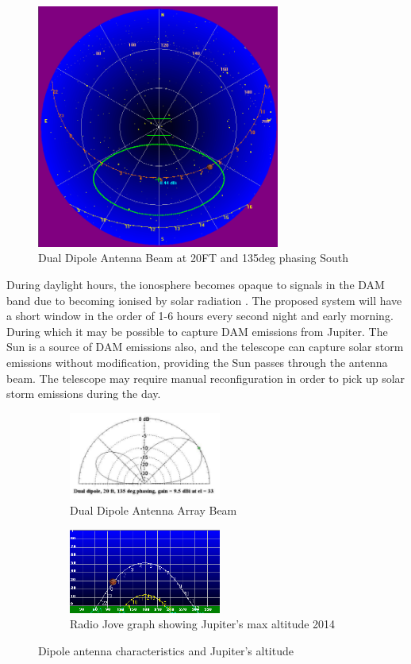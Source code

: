 %
\begin{figure}[here]
\centering
\includegraphics[width=8cm]{images/07}
\caption{Dual Dipole Antenna Beam at 20FT and 135deg phasing South \citep{nasa12}}
\label{fig:dual_dipole_20ft_135phasing_s}
\end{figure}
%

During daylight hours, the ionosphere becomes opaque to signals in the \gls{DAM} band due to becoming ionised by solar radiation \citep{nasa-ionosphere-12}. The proposed system will have a short window in the order of 1-6 hours every second night and early morning. During which it may be possible to capture \gls{DAM} emissions from Jupiter. The Sun is a source of \gls{DAM} emissions also, and the telescope can capture solar storm emissions without modification, providing the Sun passes through the antenna beam. The telescope may require manual reconfiguration in order to pick up solar storm emissions during the day.


%
\begin{figure}	
	\centering
	\begin{subfigure}[t]{5cm}
		\centering
		\includegraphics[width=5cm]{images/09}
		\caption{Dual Dipole Antenna Array Beam \citep{nasa12}}
		\label{fig:dual_dipole_antenna_array_beam}	
	\end{subfigure}
	\quad
	\begin{subfigure}[t]{5cm}
		\centering
		\includegraphics[width=5cm]{images/11}
		\caption{Radio Jove graph showing Jupiter's max altitude 2014 \citep{rjp-14}}
		\label{fig:jupiter_max_altitude_2014}
	\end{subfigure}
	\caption{Dipole antenna characteristics and Jupiter's altitude}
	\label{fig:dipole_beam_jupiter_altitude}
\end{figure}
%

